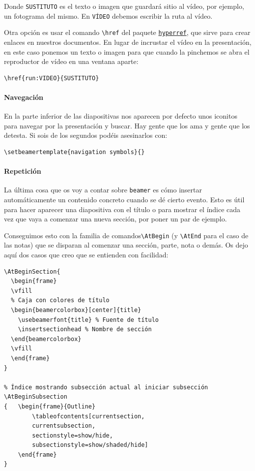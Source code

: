 Donde \lstinline!SUSTITUTO! es el texto o imagen que guardará sitio al
vídeo, por ejemplo, un fotograma del mismo. En \lstinline!VÍDEO! debemos
escribir la ruta al vídeo.

Otra opción es usar el comando \lstinline!\href! del paquete
\href{https://www.ctan.org/pkg/hyperref?lang=en}{\lstinline!hyperref!},
que sirve para crear enlaces en nuestros documentos. En lugar de
incrustar el vídeo en la presentación, en este caso ponemos un texto o
imagen para que cuando la pinchemos se abra el reproductor de vídeo en
una ventana aparte:

\begin{lstlisting}
\href{run:VIDEO}{SUSTITUTO}
\end{lstlisting}

\paragraph{Navegación}

En la parte inferior de las diapositivas nos aparecen por defecto unos
iconitos para navegar por la presentación y buscar. Hay gente que los
ama y gente que los detesta. Si sois de los segundos podéis asesinarlos
con:

\begin{lstlisting}[language={[latex]tex}]
\setbeamertemplate{navigation symbols}{}
\end{lstlisting}

\paragraph{Repetición}

La última cosa que os voy a contar sobre \lstinline!beamer! es cómo
insertar automáticamente un contenido concreto cuando se dé cierto
evento. Esto es útil para hacer aparecer una diapositiva con el título o
para mostrar el índice cada vez que vaya a comenzar una nueva sección,
por poner un par de ejemplo.

Conseguimos esto con la familia de comandos\lstinline!\AtBegin! (y
\lstinline!\AtEnd! para el caso de las notas) que se disparan al
comenzar una sección, parte, nota o demás. Os dejo aquí dos casos que
creo que se entienden con facilidad:

\begin{lstlisting}[language={[latex]tex}]
% Diapositiva con el título de sección al iniciar sección
\AtBeginSection{
  \begin{frame}
  \vfill
  % Caja con colores de título
  \begin{beamercolorbox}[center]{title}
    \usebeamerfont{title} % Fuente de título
    \insertsectionhead % Nombre de sección
  \end{beamercolorbox}
  \vfill
  \end{frame}
}

% Índice mostrando subsección actual al iniciar subsección
\AtBeginSubsection
{   \begin{frame}{Outline}
        \tableofcontents[currentsection,
        currentsubsection,
        sectionstyle=show/hide,
        subsectionstyle=show/shaded/hide] 
    \end{frame}
}
\end{lstlisting}

